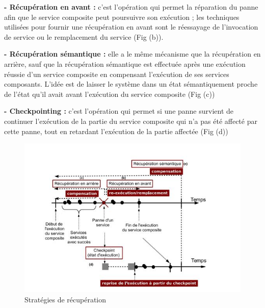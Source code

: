 \textbf{- Récupération en avant :} c'est l'opération qui permet la réparation du panne afin que le  service composite peut poursuivre son exécution ; les techniques utilisées pour fournir une récupération en avant sont le réessayage de l’invocation de service ou le remplacement du service (Fig (b)).


\textbf{- Récupération sémantique : }elle a le même mécanisme que la récupération en arrière, sauf que la récupération sémantique est effectuée après une exécution réussie d’un service composite en compensant l’exécution de ses services composants. L’idée est de laisser le système dans un état sémantiquement proche de l’état qu’il avait avant l’exécution du service composite (Fig (c))

\textbf{- Checkpointing :} c'est l'opération qui permet si une panne survient de continuer l’exécution de la partie du service composite qui n’a pas été affecté par cette panne, tout en retardant l’exécution de la partie affectée (Fig (d))

\begin{figure}[H]
\begin{center}
\includegraphics[width=1\linewidth]{images/techsreparation.jpg}
\end{center}
\caption{Stratégies de récupération \cite{1}}
\label{fig:3}
\end{figure}